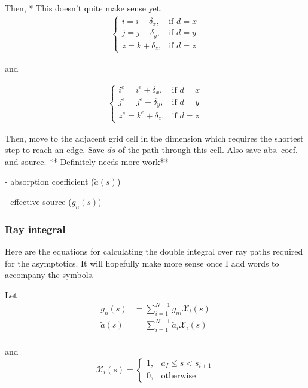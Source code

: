 Then,
* This doesn't quite make sense yet.
\begin{align}
  \begin{cases}
    i = i+\delta_x, & \mbox{if } d=x \\
    j = j+\delta_y, & \mbox{if } d=y \\
    z = k+\delta_z, & \mbox{if } d=z
  \end{cases}
\end{align}

and

\begin{align}
  \begin{cases}
    i^e = i^e+\delta_x, & \mbox{if } d=x \\
    j^e = j^e+\delta_y, & \mbox{if } d=y \\
    z^e = k^e+\delta_z, & \mbox{if } d=z
  \end{cases}
\end{align}


Then, move to the adjacent grid cell in the dimension which requires the shortest
step to reach an edge. Save $ds$ of the path through this cell. Also save abs.
coef. and source.
** Definitely needs more work**

- absorption coefficient ($\tilde{a}(s)$)

- effective source ($g_n(s)$)

\subsubsection{Ray integral}

Here are the equations for calculating the double integral over ray paths
required for the asymptotics. It will hopefully make more sense once I add words
to accompany the symbols.

Let
\begin{align}
  g_n(s) &= \sum_{i=1}^{N-1}g_{ni}\mathcal{X}_i(s) \\
  \tilde{a}(s) &= \sum_{i=1}^{N-1}\tilde{a}_{i}\mathcal{X}_i(s) \\
\end{align}

and
\begin{equation}
  \mathcal{X}_i(s) = \begin{cases}
    1, & a_I \leq s < s_{i+1} \\
    0, & \mbox{otherwise}
    \end{cases}
\end{equation}

